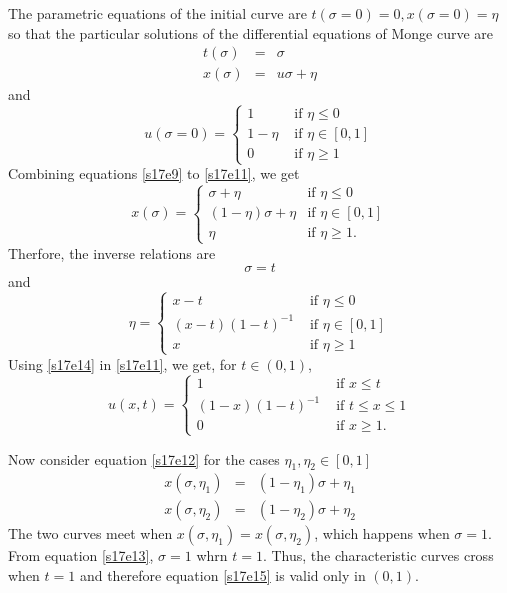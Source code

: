 \documentclass{article}
\theoremstyle{plain}
\numberwithin{thm}{section}
\theoremstyle{plain}
\numberwithin{prop}{section}
\theoremstyle{definition}
\numberwithin{defn}{section}
\theoremstyle{remark}
\numberwithin{equation}{section}
\begin{document}
\begin{enumerate}
\begin{itemize}
The parametric equations of the initial curve are $t(\sigma = 0) = 0, x(\sigma = 0) = \eta$ 
so that the particular solutions of the differential equations of Monge curve are
\begin{eqnarray}
t(\sigma) &=& \sigma \label{s17e9} \\
x(\sigma) &=& u\sigma + \eta \label{s17e10}
\end{eqnarray}
and 
\begin{equation}\label{s17e11}
u(\sigma = 0) = \begin{cases}
1 & \text{ if } \eta \le 0 \\
1 - \eta & \text{ if } \eta \in [0, 1] \\
0 & \text{ if } \eta \ge 1
\end{cases}
\end{equation}
Combining equations \eqref{s17e9} to \eqref{s17e11}, we get
\begin{equation}\label{s17e12}
x(\sigma) = \begin{cases}
\sigma + \eta & \text{if } \eta \le 0 \\
(1 - \eta)\sigma + \eta & \text{if } \eta \in [0, 1] \\
\eta & \text{if } \eta \ge 1.
\end{cases}
\end{equation}
Therfore, the inverse relations are
\begin{equation}\label{s17e13}
\sigma = t
\end{equation}
and
\begin{equation}\label{s17e14}
\eta = \begin{cases}
x - t & \text{ if } \eta \le 0 \\
(x - t)(1 - t)^{-1} & \text{ if } \eta \in [0, 1] \\
x  & \text{ if } \eta \ge 1
\end{cases}
\end{equation}
Using \eqref{s17e14} in \eqref{s17e11}, we get, for $t \in (0, 1)$,
\begin{equation}\label{s17e15}
u(x, t) = \begin{cases}
1 & \text{ if } x \le t \\
(1 - x)(1 - t)^{-1} & \text{ if } t \le x \le 1 \\
0 & \text{ if } x \ge 1.
\end{cases}
\end{equation}

Now consider equation \eqref{s17e12} for the cases $\eta_1, \eta_2 \in [0, 1]$
\begin{eqnarray}
x(\sigma, \eta_1) &=& (1 - \eta_1)\sigma + \eta_1 \label{s17e16} \\
x(\sigma, \eta_2) &=& (1 - \eta_2)\sigma + \eta_2 \label{s17e17}
\end{eqnarray}
The two curves meet when $x(\sigma, \eta_1) = x(\sigma, \eta_2)$, which happens when $\sigma = 1$.
From equation \eqref{s17e13}, $\sigma = 1$ whrn $t = 1$. Thus, the characteristic curves cross when
$t = 1$ and therefore equation \eqref{s17e15} is valid only in $(0, 1)$.


\end{itemize}
\end{enumerate}
\end{document}
